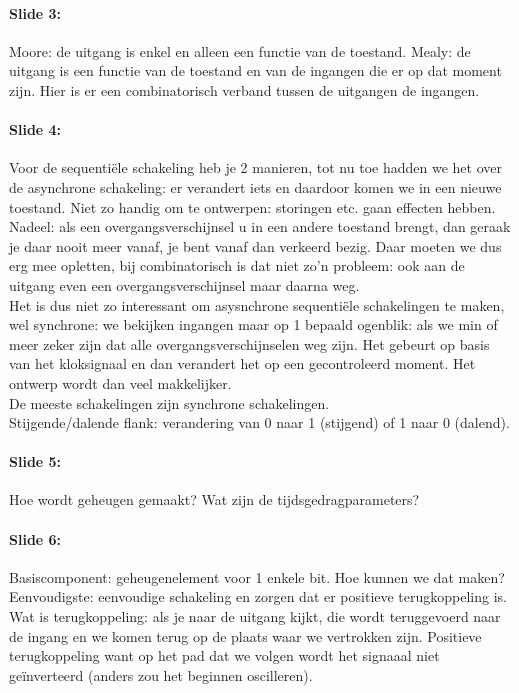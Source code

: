 \documentclass[10pt,a4paper]{book}
\begin{document}
\paragraph{Slide 3:} Moore: de uitgang is enkel en alleen een functie van de toestand. Mealy: de uitgang is een functie van de toestand en van de ingangen die er op dat moment zijn. Hier is er een combinatorisch verband tussen de uitgangen de ingangen.

\paragraph{Slide 4:} Voor de sequenti\"ele schakeling heb je 2 manieren, tot nu toe hadden we het over de asynchrone schakeling: er verandert iets en daardoor komen we in een nieuwe toestand. Niet zo handig om te ontwerpen: storingen etc. gaan effecten hebben. Nadeel: als een overgangsverschijnsel u in een andere toestand brengt, dan geraak je daar nooit meer vanaf, je bent vanaf dan verkeerd bezig. Daar moeten we dus erg mee opletten, bij combinatorisch is dat niet zo'n probleem: ook aan de uitgang even een overgangsverschijnsel maar daarna weg.\\
Het is dus niet zo interessant om asysnchrone sequenti\"ele schakelingen te maken, wel synchrone: we bekijken ingangen maar op 1 bepaald ogenblik: als we min of meer zeker zijn dat alle overgangsverschijnselen weg zijn. Het gebeurt op basis van het kloksignaal en dan verandert het op een gecontroleerd moment. Het ontwerp wordt dan veel makkelijker.\\
De meeste schakelingen zijn synchrone schakelingen.\\
Stijgende/dalende flank: verandering van 0 naar 1 (stijgend) of 1 naar 0 (dalend).

\paragraph{Slide 5:} Hoe wordt geheugen gemaakt? Wat zijn de tijdsgedragparameters? 

\paragraph{Slide 6:} Basiscomponent: geheugenelement voor 1 enkele bit. Hoe kunnen we dat maken? Eenvoudigste: eenvoudige schakeling en zorgen dat er positieve terugkoppeling is. Wat is terugkoppeling: als je naar de uitgang kijkt, die wordt teruggevoerd naar de ingang en we komen terug op de plaats waar we vertrokken zijn. Positieve terugkoppeling want op het pad dat we volgen wordt het signaaal niet ge\"inverteerd (anders zou het beginnen oscilleren).
\end{document}
